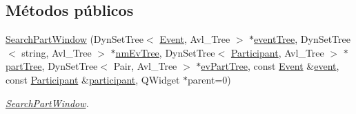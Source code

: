 \subsection*{Métodos públicos}
\begin{DoxyCompactItemize}
\item 
\hyperlink{class_search_part_window_af131c1ff4c895be7cf89297a1a0ebe8f}{Search\+Part\+Window} (Dyn\+Set\+Tree$<$ \hyperlink{class_event}{Event}, Avl\+\_\+\+Tree $>$ $\ast$\hyperlink{class_search_part_window_a70bfb58ce1b291097b6f8260a01dd963}{event\+Tree}, Dyn\+Set\+Tree$<$ string, Avl\+\_\+\+Tree $>$ $\ast$\hyperlink{class_search_part_window_a854fb641761bacb66fd37e7a374d24cd}{nm\+Ev\+Tree}, Dyn\+Set\+Tree$<$ \hyperlink{class_participant}{Participant}, Avl\+\_\+\+Tree $>$ $\ast$\hyperlink{class_search_part_window_a326f1ee938350effb3880fdadef5572e}{part\+Tree}, Dyn\+Set\+Tree$<$ Pair, Avl\+\_\+\+Tree $>$ $\ast$\hyperlink{class_search_part_window_a3b3b437a4bff65af353737694d5d5e7a}{ev\+Part\+Tree}, const \hyperlink{class_event}{Event} \&\hyperlink{class_search_part_window_afe6bf1b97fe257cc015f58a5501aadb8}{event}, const \hyperlink{class_participant}{Participant} \&\hyperlink{class_search_part_window_ac83a2e699f5479acfbecaa2cddbe0450}{participant}, Q\+Widget $\ast$parent=0)
\begin{DoxyCompactList}\small\item\em \hyperlink{class_search_part_window}{Search\+Part\+Window}. \end{DoxyCompactList}\end{DoxyCompactItemize}
